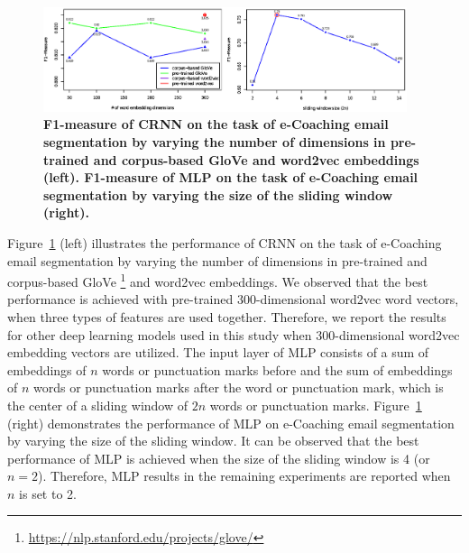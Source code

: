 \documentclass{amia}
\begin{document}
\begin{figure}[!htb]
    \centering
    \includegraphics[width=0.95\textwidth]{figures/mlp-and-vector.eps}
    \caption{\textbf{F1-measure of CRNN on the task of e-Coaching email segmentation by varying the number of dimensions in pre-trained and corpus-based GloVe and word2vec embeddings (left). F1-measure of MLP on the task of e-Coaching email segmentation by varying the size of the sliding window (right).}}
    \label{fig:embedding-dimension-mlp}
\end{figure}   

Figure~\ref{fig:embedding-dimension-mlp} (left) illustrates the performance of CRNN on the task of e-Coaching email segmentation by varying the number of dimensions in pre-trained and corpus-based GloVe \footnote{\url{https://nlp.stanford.edu/projects/glove/}} and word2vec embeddings. We observed that the best performance is achieved with pre-trained 300-dimensional word2vec word vectors, when three types of features are used together. Therefore, we report the results for other deep learning models used in this study when 300-dimensional word2vec embedding vectors are utilized. The input layer of MLP consists of a sum of embeddings of $n$ words or punctuation marks before and the sum of embeddings of $n$ words or punctuation marks after the word or punctuation mark, which is the center of a sliding window of $2n$ words or punctuation marks. Figure~\ref{fig:embedding-dimension-mlp} (right) demonstrates the performance of MLP on e-Coaching email segmentation by varying the size of the sliding window. It can be observed that the best performance of MLP is achieved when the size of the sliding window is 4 (or $n=2$). Therefore, MLP results in the remaining experiments are reported when $n$ is set to 2.
\end{document}
